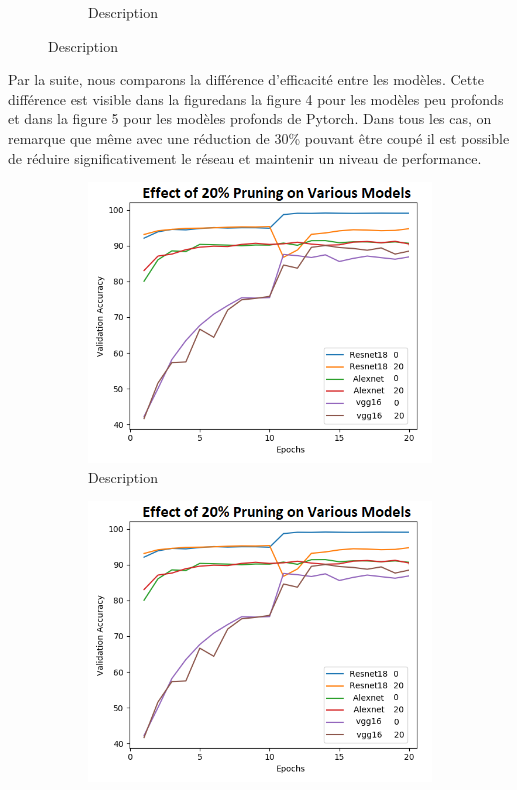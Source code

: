 \documentclass[12pt]{article}
\begin{document}
\begin{figure}[H]
\begin{subfigure}[b]{0.5\textwidth}
		\caption{Description}
		\label{fig:pruneratioslow}
	\end{subfigure}
\end{figure}

Par la suite, nous comparons la différence d’efficacité entre les modèles. Cette différence est visible dans la figuredans la figure 4 pour les modèles peu profonds et dans la figure 5 pour les modèles profonds de Pytorch. Dans tous les cas, on remarque que même avec une réduction de 30\% pouvant être coupé il est possible de réduire significativement le réseau et maintenir un niveau de performance.
\begin{figure}[H]
	\centering
	\begin{subfigure}[b]{0.5\textwidth}            
		\includegraphics[width=\textwidth]{various_models_shallow}
		\caption{Description}
		\label{fig:SRl}
	\end{subfigure}%
	\begin{subfigure}[b]{0.5\textwidth}
		\centering
		\includegraphics[width=\textwidth]{various_models_deep}

\end{subfigure}
\end{figure}
\end{document}
